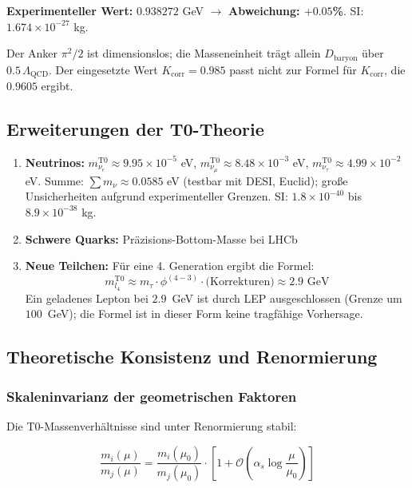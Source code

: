 	\textbf{Experimenteller Wert:} $0.938272$ GeV $\rightarrow$ \textbf{Abweichung: $+0.05$\%}. SI: $1.674 \times 10^{-27}$ kg.

	Der Anker $\pi^2/2$ ist dimensionslos; die Masseneinheit trägt allein $D_{\text{baryon}}$ über $0.5\,\Lambda_{\text{QCD}}$. Der eingesetzte Wert $K_{\text{corr}} = 0.985$ passt nicht zur Formel für $K_{\text{corr}}$, die $0.9605$ ergibt.

	\subsection{Erweiterungen der T0-Theorie}
	
	\begin{enumerate}
		\item \textbf{Neutrinos:} $m_{\nu_e}^{\text{T0}} \approx 9.95 \times 10^{-5}$ eV, $m_{\nu_\mu}^{\text{T0}} \approx 8.48 \times 10^{-3}$ eV, $m_{\nu_\tau}^{\text{T0}} \approx 4.99 \times 10^{-2}$ eV. Summe: $\sum m_\nu \approx 0.0585$ eV (testbar mit DESI, Euclid); große Unsicherheiten aufgrund experimenteller Grenzen. SI: $1.8 \times 10^{-40}$ bis $8.9 \times 10^{-38}$ kg.
		
		
		\item \textbf{Schwere Quarks:} Präzisions-Bottom-Masse bei LHCb
		
		\item \textbf{Neue Teilchen:} Für eine 4. Generation ergibt die Formel:
		\begin{equation}
			m_{l_4}^{\text{T0}} \approx m_\tau \cdot \phi^{(4-3)} \cdot \text{(Korrekturen)} \approx 2.9 \text{ GeV}
		\end{equation}
		Ein geladenes Lepton bei $2.9$~GeV ist durch LEP ausgeschlossen (Grenze um $100$~GeV); die Formel ist in dieser Form keine tragfähige Vorhersage.
	\end{enumerate}
	
	\subsection{Theoretische Konsistenz und Renormierung}
	
	\subsubsection{Skaleninvarianz der geometrischen Faktoren}
	
	Die T0-Massenverhältnisse sind unter Renormierung stabil:
	
	\begin{equation}
		\frac{m_i(\mu)}{m_j(\mu)} = \frac{m_i(\mu_0)}{m_j(\mu_0)} \cdot \left[1 + \mathcal{O}\left(\alpha_s \log\frac{\mu}{\mu_0}\right)\right]
	\end{equation}
	
